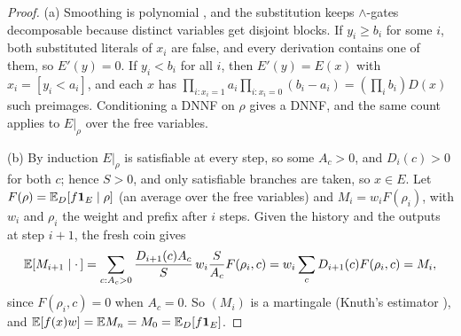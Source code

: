 \begin{proof}
(a) Smoothing is polynomial \cite{darwiche2001dnnf}, and the substitution keeps
$\wedge$-gates decomposable because distinct variables get disjoint blocks. If
$y_i\ge b_i$ for some $i$, both substituted literals of $x_i$ are false, and every
derivation contains one of them, so $E'(y)=0$. If $y_i<b_i$ for all $i$, then
$E'(y)=E(x)$ with $x_i=[y_i<a_i]$, and each $x$ has
$\prod_{i:x_i=1}a_i\prod_{i:x_i=0}(b_i-a_i)=(\prod_ib_i)D(x)$ such preimages.
Conditioning a DNNF on $\rho$ gives a DNNF, and the same count applies to $E|_\rho$
over the free variables.

(b) By induction $E|_\rho$ is satisfiable at every step, so some $A_c>0$, and
$D_i(c)>0$ for both $c$; hence $S>0$, and only satisfiable branches are taken, so
$x\in E$. Let $F(\rho)=\mathbb{E}_D[f\mathbf{1}_E\mid\rho]$ (an average over the free variables)
and $M_i=w_iF(\rho_i)$, with $w_i$ and $\rho_i$ the weight and prefix after $i$
steps. Given the history and the outputs at step $i+1$, the fresh coin gives
\[
\mathbb{E}[M_{i+1}\mid\cdot\,]=\sum_{c:A_c>0}\frac{D_{i+1}(c)A_c}{S}\,w_i\frac{S}{A_c}F(\rho_i,c)
=w_i\sum_cD_{i+1}(c)F(\rho_i,c)=M_i,
\]
since $F(\rho_i,c)=0$ when $A_c=0$. So $(M_i)$ is a martingale (Knuth's estimator
\cite{knuth1975}), and $\mathbb{E}[f(x)w]=\mathbb{E} M_n=M_0=\mathbb{E}_D[f\mathbf{1}_E]$.


\end{proof}
